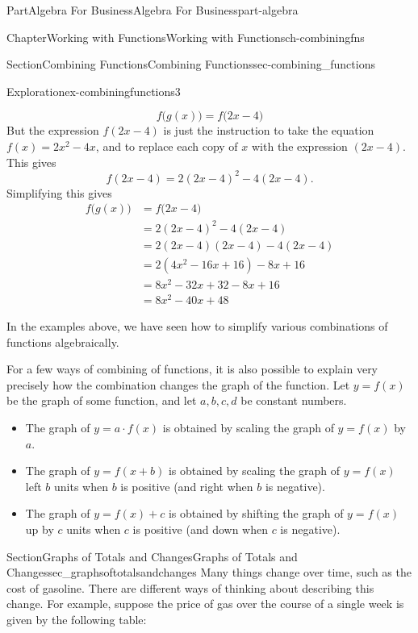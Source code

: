 \documentclass[oneside,10pt,]{tufte-book}
\numberwithin{equation}{chapter}
\newcommand{\amp}{&}
\begin{document}
\begin{partptx}{Part}{Algebra For Business}{}{Algebra For Business}{}{}{part-algebra}
\begin{chapterptx}{Chapter}{Working with Functions}{}{Working with Functions}{}{}{ch-combiningfns}
\begin{sectionptx}{Section}{Combining Functions}{}{Combining Functions}{}{}{sec-combining_functions}
\begin{exploration}{Exploration}{}{ex-combiningfunctions3}
\begin{enumerate}[font=\bfseries,label=(\alph*),ref=\alph*]
\begin{equation*}
f\Big(g(x)\Big) = f\Big(2x-4\Big)
\end{equation*}
But the expression \(f(2x-4)\) is just the instruction to take the equation \(f(x) = 2x^2-4x\), and to replace each copy of \(x\) with the expression \((2x-4)\). This gives%
\begin{equation*}
f(2x-4) = 2(2x-4)^2 - 4(2x-4)\text{.}
\end{equation*}
Simplifying this gives%
\begin{align*}
f\Big(g(x)\Big) \amp = f\Big(2x-4\Big) \\
\amp = 2(2x-4)^2 - 4(2x-4)\\
\amp = 2(2x-4)(2x-4) - 4(2x-4)\\
\amp = 2(4x^2-16x+16) - 8x + 16\\
\amp = 8x^2 -32x + 32 - 8x + 16\\
\amp = 8x^2 - 40x + 48 
\end{align*}
%
\end{enumerate}%
\end{exploration}%
In the examples above, we have seen how to simplify various combinations of functions algebraically.%
\par
For a few ways of combining of functions, it is also possible to explain very precisely how the combination changes the graph of the function. Let \(y = f(x)\) be the graph of some function, and let \(a,b,c,d\) be constant numbers.%
\begin{itemize}[label=\textbullet]
\item{}The graph of \(y = a\cdot f(x)\) is obtained by scaling the graph of \(y=f(x)\) by \(a\).%
\item{}The graph of \(y = f(x + b)\) is obtained by scaling the graph of \(y=f(x)\) left \(b\) units when \(b\) is positive (and right when \(b\) is negative).%
\item{}The graph of \(y = f(x) + c\) is obtained by shifting the graph of \(y=f(x)\) up by \(c\) units when \(c\) is positive (and down when \(c\) is negative).%
\end{itemize}
%
\end{sectionptx}
%
%
\typeout{************************************************}
\typeout{************************************************}
%
\begin{sectionptx}{Section}{\textasteriskcentered{}Graphs of Totals and Changes}{}{\textasteriskcentered{}Graphs of Totals and Changes}{}{}{sec_graphsoftotalsandchanges}
Many things change over time, such as the cost of gasoline. There are different ways of thinking about describing this change. For example, suppose the price of gas over the course of a single week is given by the following table:%

\end{sectionptx}
\end{chapterptx}
\end{partptx}
\end{document}
